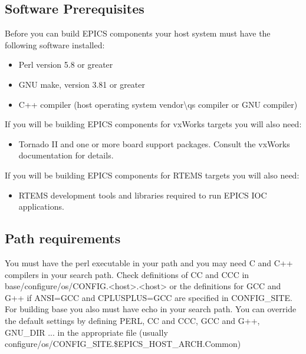 \subsection{Software Prerequisites}

Before you can build EPICS components your host system must have the following software installed: 

\begin{itemize}\item {}Perl version 5.8 or greater

\item {}GNU make, version 3.81 or greater

\item C++ compiler (host operating system vendor\textbackslash{}qs compiler or GNU compiler)

\end{itemize}If you will be building EPICS components for vxWorks targets you will also need:

\begin{itemize}\item {}Tornado II and one or more board support packages. Consult the vxWorks documentation for details.

\end{itemize}If you will be building EPICS components for RTEMS targets you will also need:

\begin{itemize}\item {}RTEMS development tools and libraries required to run EPICS IOC applications.

\end{itemize}\subsection{Path requirements}

You must have the perl executable in your path and you may need C and C++ compilers in your search path. Check 
definitions of CC and CCC in base/configure/os/CONFIG.\textless{}host\textgreater{}.\textless{}host\textgreater{} or the definitions for GCC and G++ if 
ANSI=GCC and CPLUSPLUS=GCC are specified in CONFIG\_SITE. For building base you also must have echo in your 
search path. You can override the default settings by defining PERL, CC and CCC, GCC and G++, GNU\_DIR ... in the 
appropriate file (usually configure/os/CONFIG\_SITE.\$EPICS\_HOST\_ARCH.Common)

